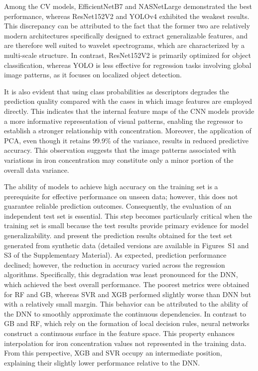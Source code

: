 \documentclass[10pt]{iopart}
\begin{document}
Among the CV models, EfficientNetB7 and NASNetLarge demonstrated the best performance,
whereas ResNet152V2 and YOLOv4 exhibited the weakest results.
This discrepancy can be attributed to the fact that the former two are relatively modern architectures
specifically designed to extract generalizable features, and are therefore well suited to wavelet spectrograms,
which are characterized by a multi-scale structure.
In contrast, ResNet152V2 is primarily optimized for object classification, whereas YOLO is less effective for regression
tasks involving global image patterns, as it focuses on localized object detection.

It is also evident that using class probabilities as descriptors degrades the prediction quality
compared with the cases in which image features are employed directly.
This indicates that the internal feature maps of the CNN models provide a more informative representation of visual patterns,
enabling the regressor to establish a stronger relationship with concentration.
Moreover, the application of PCA, even though it retains 99.9\% of the variance, results in reduced predictive accuracy.
This observation suggests that the image patterns associated with variations in iron concentration may constitute
only a minor portion of the overall data variance.

The ability of models to achieve high accuracy on the training set is a prerequisite for effective performance on unseen data;
however, this does not guarantee reliable prediction outcomes.
Consequently, the evaluation of an independent test set is essential.
This step becomes particularly critical when the training set is small  because the test results provide primary evidence for model generalizability.
 and  present the prediction results obtained for the test set generated from synthetic data
(detailed versions are available in Figures~S1 and S3 of the Supplementary Material).
As expected, prediction performance declined; however, the reduction in accuracy varied across the regression algorithms.
Specifically, this degradation was least pronounced for the DNN, which achieved the best overall performance.
The poorest metrics were obtained for RF and GB, whereas SVR and XGB performed slightly worse than DNN but with a relatively small margin.
This behavior can be attributed to the ability of the DNN to smoothly approximate the continuous dependencies.
In contrast to GB and RF, which rely on the formation of local decision rules,
neural networks construct a continuous surface in the feature space.
This property enhances interpolation for iron concentration values not represented in the training data.
From this perspective, XGB and SVR occupy an intermediate position, explaining their slightly lower performance relative to the DNN.
\end{document}

